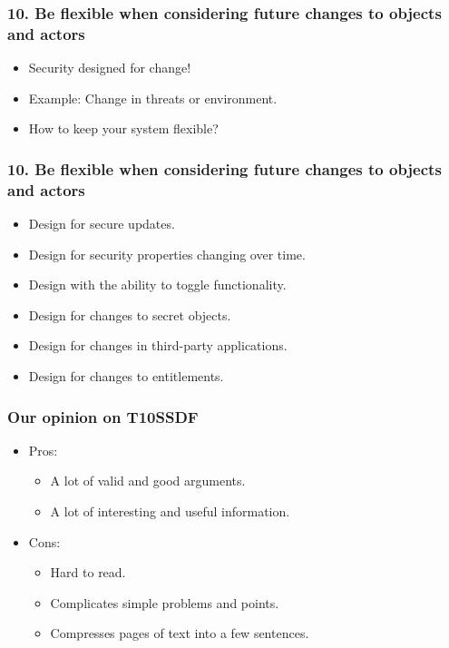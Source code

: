 \documentclass[12pt,norsk]{beamer}
\begin{document}
\begin{frame}

	\frametitle{10. Be flexible when considering future changes to objects and actors}
	\begin{itemize}
		\item Security designed for change!
		\item Example: Change in threats or environment.
		\item How to keep your system flexible?
	\end{itemize}
	
	

\end{frame}

\begin{frame}

	\frametitle{10. Be flexible when considering future changes to objects and actors}
	\begin{itemize}
		\item Design for secure updates.
		\item Design for security properties changing over time.
		\item Design with the ability to toggle functionality.
		\item Design for changes to secret objects.
		\item Design for changes in third-party applications.
		\item Design for changes to entitlements.
	\end{itemize}
	
	

\end{frame}

\begin{frame}

	\frametitle{Our opinion on T10SSDF}

	\begin{itemize}

		\item Pros:
		
		\begin{itemize}
			
			\item A lot of valid and good arguments.
			\item A lot of interesting and useful information.		
		\end{itemize}				
				
		\item Cons:
		
		\begin{itemize}
			
			\item Hard to read.
			\item Complicates simple problems and points.
			\item Compresses pages of text into a few sentences.
			
		\end{itemize}
	\end{itemize}

\end{frame}
\end{document}
